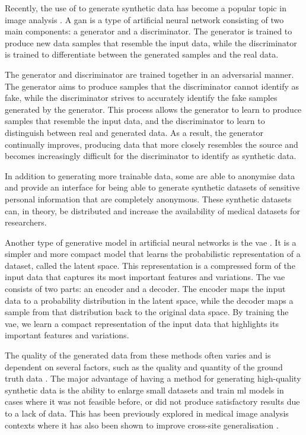 \documentclass[12pt, a4paper]{article}
\begin{document}
Recently, the use of  to generate synthetic data has become a popular topic in image analysis \cite{pavan_kumar_generative_2021}.  A \acrshort{gan} is a type of artificial neural network consisting of two main components: a generator and a discriminator. The generator is trained to produce new data samples that resemble the input data, while the discriminator is trained to differentiate between the generated samples and the real data.

The generator and discriminator are trained together in an adversarial manner. The generator aims to produce samples that the discriminator cannot identify as fake, while the discriminator strives to accurately identify the fake samples generated by the generator. This process allows the generator to learn to produce samples that resemble the input data, and the discriminator to learn to distinguish between real and generated data. As a result, the generator continually improves, producing data that more closely resembles the source and becomes increasingly difficult for the discriminator to identify as synthetic data.

In addition to generating more trainable data, some  are able to anonymise data \cite{liu_ppgan_2019} and provide an interface for being able to generate synthetic datasets of sensitive personal information that are completely anonymous. These synthetic datasets can, in theory, be distributed and increase the availability of medical datasets for researchers.

Another type of generative model in artificial neural networks is the \acrfull{vae} \cite{kingma_auto-encoding_2013}. It is a simpler and more compact model that learns the probabilistic representation of a dataset, called the latent space. This representation is a compressed form of the input data that captures its most important features and variations. The \acrshort{vae} consists of two parts: an encoder and a decoder. The encoder maps the input data to a probability distribution in the latent space, while the decoder maps a sample from that distribution back to the original data space. By training the \acrshort{vae}, we learn a compact representation of the input data that highlights its important features and variations.

The quality of the generated data from these methods often varies and is dependent on several factors, such as the quality and quantity of the ground truth data \cite{karras_training_2020}.  The major advantage of having a method for generating high-quality synthetic data is the ability to enlarge small datasets and train \acrshort{ml}  models in cases where it was not feasible before, or did not produce satisfactory results due to a lack of data. This has been previously explored in medical image analysis contexts where it has also been shown to improve cross-site generalisation \cite{sanaat_robust-deep_2022, bashyam_deep_2022}.
\end{document}
